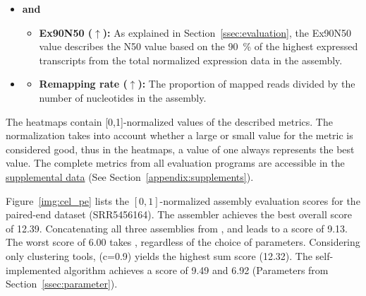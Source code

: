 \documentclass[12pt,a4paper,english]{article}
\begin{document}
\begin{itemize}
			\item \textbf{\trinity and \salmon} \citep{Trinity:11, salmon:17}

				\begin{itemize}
					\item \textbf{Ex90N50 ($\uparrow$):}
					As explained in Section~\ref{ssec:evaluation}, the Ex90N50 value describes the N50 value based on the 90~\% of the highest expressed transcripts  from the total normalized expression data in the assembly.
				\end{itemize}

			\item \textbf{\hisat} \citep{hisat2:15}
				\begin{itemize}
					\item \textbf{Remapping rate ($\uparrow$):} The proportion of mapped reads divided by the number of nucleotides in the assembly.
				\end{itemize}
		
		\end{itemize}
	
	
	The heatmaps contain [0,1]-normalized values of the described metrics. The normalization takes into account whether a large or small value for the metric is considered good, thus in the heatmaps, a value of one always represents the best value.
	The complete metrics from all evaluation programs are accessible in the \href{https://github.com/lmfaber/master_thesis/tree/master/supplemental_data/assembly_eval}{supplemental data} (See Section~\ref{appendix:supplements}).

		
	

	\newpage
    Figure~\ref{img:cel_pe} lists the $[0,1]$-normalized assembly evaluation scores for the paired-end \celegans dataset (SRR5456164). The assembler \spades achieves the best overall score of 12.39. Concatenating all three assemblies from \spades, \soap and \trinity leads to a score of 9.13. The worst score of 6.00 takes \grouper, regardless of the choice of parameters. Considering only clustering tools, \cdhit (c=0.9) yields the highest sum score (12.32). The self-implemented algorithm \karma achieves a score of 9.49 and 6.92 (Parameters from Section~\ref{ssec:parameter}).\\
	
\end{document}
